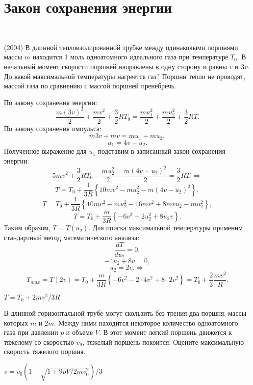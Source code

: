 \section{Закон сохранения энергии}

\begin{ex}
\hspace{0pt} \\
\begin{minipage}{.65\textwidth}
(2004) В длинной теплоизолированной трубке между одинаковыми поршнями массы $m$ находится 1 моль одноатомного идеального газа при температуре $T_0$. 
В начальный момент скорости поршней направлены в одну сторону и равны $v$ и $3v$. До какой максимальной температуры нагреется газ? 
Поршни тепло не проводят, массой газа по сравнению с массой поршней пренебречь.
\end{minipage}
\begin{minipage}{.35\textwidth}
\centering

\end{minipage}
\begin{sol}
	По закону сохранения энергии:
	$$ \frac{m(3v)^2}{2} + \frac{ mv^2}{2} + \frac{3}{2}RT_{0} = 
	\frac{m u_1^2}{2} + \frac{ mu_2^2}{2} + \frac{3}{2}RT. $$
	По закону сохранения импульса:
	$$ m3v + mv = mu_1 + mu_2,$$
	$$u_{1}=4v-u_{2}.$$
	Полученное выражение для $u_1$ подставим в записанный закон сохранения энергии:
	$$5mv^2+\frac{3}{2}RT_{0}-\frac{mu_{2}^2}{2}-\frac{m(4v-u_{2})^2}{2}=\frac{3}{2}RT. \Rightarrow$$
	$$T=T_{0}+\frac{1}{3R} \left\{10mv^2-mu_{2}^2-m(4v-u_{2})^2\right\},$$
	$$T=T_{0}+\frac{1}{3R} \left\{10mv^2-mu_{2}^2-16mv^2+8mvu_{2}-mu_{2}^2\right\},$$
	$$T=T_0+\frac{m}{3R} \left\{-6v^2-2u_{2}^2+8u_{2}v\right\}.$$
	Таким образом, $T=T \left(u_{2}\right).$
	Для поиска максимальной температуры применим стандартный метод математического анализа:
	$$\frac{dT}{du_{2}}=0,$$
	$$-4u_{2}+8v=0,$$
	$$u_{2}=2v. \Rightarrow$$
	$$T_{max} = T\left(2v\right)=T_{0}+\frac{m}{3R}\left\{-6v^2-2\cdot4v^2+8\cdot2v^2\right\}=T_{0}+\frac{2}{3}\frac{mv^2}{R}.$$
\end{sol}
\begin{ans}
$T=T_0+2mv^2/3R$
\end{ans}
\end{ex}

\begin{ex}
В длинной горизонтальной трубе могут скользить без трения два поршня, массы которых $m$ и $2m$. 
Между ними находится некоторое количество одноатомного газа при давлении $p$ и объеме $V$. 
В этот момент легкий поршень движется к тяжелому со скоростью $v_0$, тяжелый поршень покоится. 
Оцените максимальную скорость тяжелого поршня.
\begin{ans}
$v = v_0\left( 1 + \sqrt{1+9pV/2mv_0^2} \right)/3$
\end{ans}
\end{ex}

